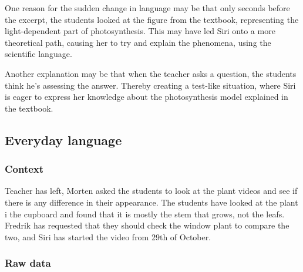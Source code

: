 One reason for the sudden change in language may be that only seconds before the excerpt, the students looked at the figure from the textbook, representing the light-dependent part of photosynthesis. This may have led Siri onto a more theoretical path, causing her to try and explain the phenomena, using the scientific language. 

Another explanation may be that when the teacher asks a question, the students think he's assessing the answer. Thereby creating a test-like situation, where Siri is eager to express her knowledge about the photosynthesis model explained in the textbook. 



\subsection{Everyday language}


\subsubsection*{Context}
Teacher has left, Morten asked the students to look at the plant videos and see if there is any difference in their appearance. The students have looked at the plant i the cupboard and found that it is mostly the stem that grows, not the leafs. Fredrik has requested that they should check the window plant to compare the two, and Siri has started the video from 29th of October.


\subsubsection*{Raw data}

